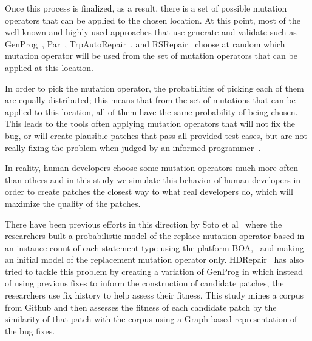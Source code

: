 \documentclass[conference]{IEEEtran}
\newcommand{\todo}[1]
  {{\scriptsize \textbf{\color{red} {#1}}}}
\begin{document}
Once this process is finalized, as a result, there is a set of possible 
mutation operators that
can be applied to the chosen location. At this point, most of the well known and highly 
used approaches that use generate-and-validate such as GenProg~\cite{legoues12}, 
Par~\cite{kim2013}, TrpAutoRepair~\cite{Qi13}, and RSRepair~\cite{Qi14} 
choose at random which mutation operator will be used from the set of mutation 
operators that can be applied at this location. 



In order to pick the mutation operator, the probabilities of picking each of
them are equally distributed; this means that from the set of mutations that can 
be applied to this location, all of them have the same probability of being 
chosen. This leads to the tools often applying mutation operators that will not fix the bug, or will create plausible patches that pass all provided 
test cases, but are not really fixing the problem when judged by an informed 
programmer~\cite{Qi15, kim2013}. 

In reality, human developers choose some mutation operators 
much more often than 
others and in this study we simulate this behavior of human developers in order 
to create patches the closest way to what real developers do, which will 
maximize the quality of the patches.

There have been previous efforts in this direction by Soto et al~\cite{Soto15} 
where the researchers built a probabilistic model of the replace mutation 
operator based in 
an instance count of each statement type using the platform 
BOA,~\cite{dyer2013} and making an initial model of the replacement mutation 
operator only. HDRepair~\cite{xuan16} has also tried to tackle this problem by 
creating a variation of GenProg in which instead of using previous fixes to
inform the construction of candidate patches, the researchers use fix history
to help assess their fitness. This study mines a corpus from Github and then assesses the fitness of each candidate patch by the similarity of that patch with the corpus using a Graph-based representation of the bug fixes.
\end{document}
